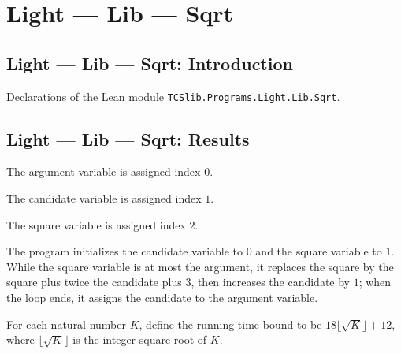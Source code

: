 \section{Light --- Lib --- Sqrt}
\subsection*{Light --- Lib --- Sqrt: Introduction}

Declarations of the Lean module \texttt{TCSlib.Programs.Light.Lib.Sqrt}.

\subsection*{Light --- Lib --- Sqrt: Results}

\begin{definition}
\label{Light.Sqrt.Arg}
\leanok
The argument variable is assigned index $0$.
\end{definition}

\begin{definition}
\label{Light.Sqrt.Cand}
\leanok
{}
The candidate variable is assigned index $1$.
\end{definition}

\begin{definition}
\label{Light.Sqrt.Square}
\leanok
{}
The square variable is assigned index $2$.
\end{definition}

\begin{definition}
\label{Light.sqrtBody}
\leanok
{}
The program initializes the candidate variable to $0$ and the square variable to $1$.
While the square variable is at most the argument, it replaces the square by the square
plus twice the candidate plus $3$, then increases the candidate by $1$; when the loop
ends, it assigns the candidate to the argument variable.
\end{definition}

\begin{definition}
\label{Light.sqrtTime}
\leanok
For each natural number $K$, define the running time bound to be $18\lfloor\sqrt
K\rfloor+12$, where $\lfloor\sqrt K\rfloor$ is the integer square root of $K$.
\end{definition}

